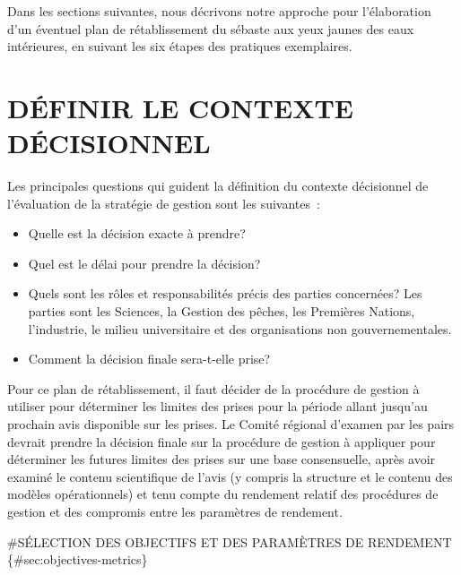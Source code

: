 \documentclass[11pt]{book}
\begin{document}
Dans les sections suivantes, nous décrivons notre approche pour l'élaboration d'un éventuel plan de rétablissement du sébaste aux yeux jaunes des eaux intérieures, en suivant les six étapes des pratiques exemplaires.

\hypertarget{sec:decision-context}{%
\section{DÉFINIR LE CONTEXTE DÉCISIONNEL}\label{sec:decision-context}}

Les principales questions qui guident la définition du contexte décisionnel de l'évaluation de la stratégie de gestion sont les suivantes~:
\begin{itemize}
\item
  Quelle est la décision exacte à prendre?
\item
  Quel est le délai pour prendre la décision?
\item
  Quels sont les rôles et responsabilités précis des parties concernées? Les parties sont les Sciences, la Gestion des pêches, les Premières Nations, l'industrie, le milieu universitaire et des organisations non gouvernementales.
\item
  Comment la décision finale sera-t-elle prise?
\end{itemize}
Pour ce plan de rétablissement, il faut décider de la procédure de gestion à utiliser pour déterminer les limites des prises pour la période allant jusqu'au prochain avis disponible sur les prises. Le Comité régional d'examen par les pairs devrait prendre la décision finale sur la procédure de gestion à appliquer pour déterminer les futures limites des prises sur une base consensuelle, après avoir examiné le contenu scientifique de l'avis (y compris la structure et le contenu des modèles opérationnels) et tenu compte du rendement relatif des procédures de gestion et des compromis entre les paramètres de rendement.

\#SÉLECTION DES OBJECTIFS ET DES PARAMÈTRES DE RENDEMENT \{\#sec:objectives-metrics\}
\end{document}
